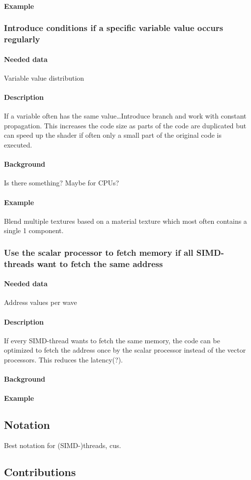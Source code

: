 \paragraph{Example}
	
\subsubsection{Introduce conditions if a specific variable value occurs regularly}
\paragraph{Needed data} Variable value distribution
\paragraph{Description} If a variable often has the same value\dots Introduce branch and work with constant propagation. This increases the code size as parts of the code are duplicated but can speed up the shader if often only a small part of the original code is executed.
\paragraph{Background} Is there something? Maybe for CPUs?
\paragraph{Example} Blend multiple textures based on a material texture which most often contains a single 1 component.
	
\subsubsection{Use the scalar processor to fetch memory if all SIMD-threads want to fetch the same address}
\paragraph{Needed data} Address values per wave
\paragraph{Description} If every SIMD-thread wants to fetch the same memory, the code can be optimized to fetch the address once by the scalar processor instead of the vector processors. This reduces the latency(?).
\paragraph{Background}
\paragraph{Example}


\subsection{Notation}
\label{sub:notation}
Best notation for (SIMD-)threads, \glspl{cu}.

\subsection{Contributions}
\label{sub:contributions}
